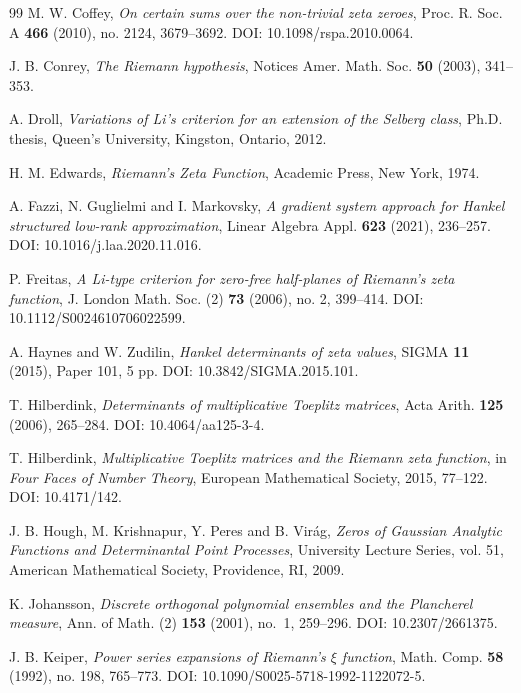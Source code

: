 \documentclass[preprint,12pt]{elsarticle}
\numberwithin{equation}{section}
\theoremstyle{plain}
\theoremstyle{definition}
\theoremstyle{remark}
\begin{document}
\begin{thebibliography}{99}
M. W. Coffey,
\emph{On certain sums over the non-trivial zeta zeroes},
Proc. R. Soc. A \textbf{466} (2010), no. 2124, 3679--3692.
DOI: 10.1098/rspa.2010.0064.

J. B. Conrey,
\emph{The Riemann hypothesis},
Notices Amer. Math. Soc. \textbf{50} (2003), 341--353.

A. Droll,
\emph{Variations of Li's criterion for an extension of the Selberg class},
Ph.D. thesis, Queen's University, Kingston, Ontario, 2012.

H. M. Edwards,
\emph{Riemann's Zeta Function},
Academic Press, New York, 1974.

A. Fazzi, N. Guglielmi and I. Markovsky,
\emph{A gradient system approach for Hankel structured low-rank approximation},
Linear Algebra Appl. \textbf{623} (2021), 236--257.
DOI: 10.1016/j.laa.2020.11.016.

P. Freitas,
\emph{A Li-type criterion for zero-free half-planes of Riemann's zeta function},
J. London Math. Soc. (2) \textbf{73} (2006), no. 2, 399--414.
DOI: 10.1112/S0024610706022599.

A. Haynes and W. Zudilin,
\emph{Hankel determinants of zeta values},
SIGMA \textbf{11} (2015), Paper 101, 5 pp.
DOI: 10.3842/SIGMA.2015.101.

T. Hilberdink,
\emph{Determinants of multiplicative Toeplitz matrices},
Acta Arith. \textbf{125} (2006), 265--284.
DOI: 10.4064/aa125-3-4.

T. Hilberdink,
\emph{Multiplicative Toeplitz matrices and the Riemann zeta function},
in \emph{Four Faces of Number Theory}, European Mathematical Society, 2015, 77--122.
DOI: 10.4171/142.

J. B. Hough, M. Krishnapur, Y. Peres and B. Vir\'ag,
\emph{Zeros of Gaussian Analytic Functions and Determinantal Point Processes},
University Lecture Series, vol. 51, American Mathematical Society, Providence, RI, 2009.

K. Johansson,
\emph{Discrete orthogonal polynomial ensembles and the Plancherel measure},
Ann. of Math. (2) \textbf{153} (2001), no.~1, 259--296.
DOI: 10.2307/2661375.

J. B. Keiper,
\emph{Power series expansions of Riemann's $\xi$ function},
Math. Comp. \textbf{58} (1992), no. 198, 765--773.
DOI: 10.1090/S0025-5718-1992-1122072-5.


\end{thebibliography}
\end{document}
